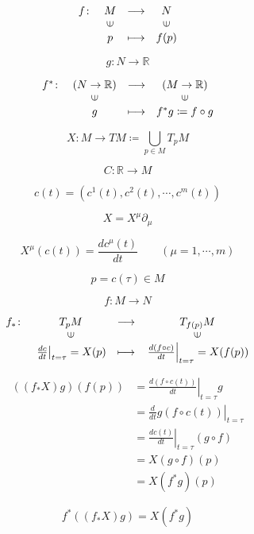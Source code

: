 \documentclass[12pt]{ujarticle}
\begin{document}
\[
  \begin{array}{rccc}
  f\colon &M                     &\longrightarrow& N                     \\
          & \rotatebox{90}{$\in$}&               & \rotatebox{90}{$\in$} \\
          & p                    & \longmapsto   & f(p)
  \end{array}
\]

\[
g\colon N \to \mathbb{R}
\]

\[
  \begin{array}{rccc}
  f^{\ast}\colon &(N \to \mathbb{R})    &\longrightarrow & (M \to \mathbb{R}) \\
                 & \rotatebox{90}{$\in$}&                & \rotatebox{90}{$\in$} \\
                 & g                    & \longmapsto    & f^{\ast}g \coloneqq f \circ g
  \end{array}
\]

\[
X \colon M \to TM \coloneqq \bigcup_{p \in M} T_p M
\]

\[
C \colon \mathbb{R} \to M
\]

\[
c(t) = (c^1(t), c^2(t), \cdots, c^m(t))
\]

\[
X = X^{\mu}\partial_{\mu}
\]

\[
X^{\mu}(c(t)) = \frac{dc^{\mu}(t)}{dt} \qquad (\mu = 1, \cdots, m)
\]

\[
p = c(\tau) \in M
\]

\[
f \colon M \to N
\]

\[
  \begin{array}{rccc}
  f_{\ast}\colon &T_p M                     &\longrightarrow& T_{f(p)}M                     \\
          & \rotatebox{90}{$\in$}&               & \rotatebox{90}{$\in$} \\
          & \left.\frac{dc}{dt}\right|_{t = \tau} = X(p) & \longmapsto   & \left.\frac{d(f\circ c)}{dt}\right|_{t = \tau} = X(f(p))
  \end{array}
\]

\begin{align}
((f_{\ast}X)g)(f(p)) &= \left.\frac{d(f\circ c(t))}{dt}\right|_{t = \tau} g \\
                     &= \left.\frac{d}{dt} g(f\circ c(t))\right|_{t = \tau} \\
                     &= \left.\frac{dc(t)}{dt}\right|_{t = \tau}(g\circ f)  \\
                     &= X(g\circ f)(p) \\
                     &= X(f^{\ast}g)(p)
\end{align}

\[
f^{\ast}((f_{\ast}X)g) = X(f^{\ast}g)
\]
\end{document}
